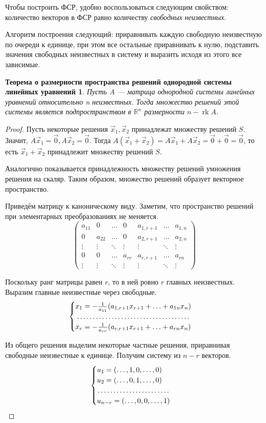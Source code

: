 \documentclass[a4paper, 12pt]{article}
\DeclareMathOperator{\rk}{rk}
\newtheorem*{solutions}{Теорема о размерности пространства решений однородной системы линейных уравнений}
\newcommand{\bbR}[0]{\mathbb{R}}
\begin{document}
Чтобы построить ФСР, удобно воспользоваться следующим свойством: количество векторов в ФСР равно количеству \textit{свободных неизвестных}.

Алгоритм построения следующий: приравнивать каждую свободную неизвестную по очереди к единице, при этом все остальные приравнивать к нулю, подставить значения свободных неизвестных в систему и выразить исходя из этого все зависимые.

\begin{solutions}
Пусть A --- матрица однородной системы линейных уравнений относительно n неизвестных. Тогда множество решений этой системы является подпространством в $\bbR^n$ размерности $n - \rk A$.
\end{solutions}
\begin{proof}
Пусть некоторые решения $\vec x_1, \vec x_2$ принадлежат множеству решений $S$. Значит, $A\vec x_1 = \vec{0}, A\vec x_2 = \vec 0$. Тогда $A(\vec x_1 + \vec x_2) = A\vec x_1 + A\vec x_2 = \vec 0 + \vec 0 = \vec 0$, то есть $\vec x_1 + \vec x_2$ принадлежит множеству решений $S$.

Аналогично показывается принадлежность множеству решений умножения решения на скаляр. Таким образом, множество решений образует векторное пространство.

Приведём матрицу к каноническому виду. Заметим, что пространство решений при элементарных преобразованиях не меняется.
\[\begin{pmatrix}a_{11} & 0 & \ldots & 0 & a_{1,r+1} & \ldots & a_{1,n} \\ 0 & a_{22} & \ldots & 0 & a_{2,r+1} & \ldots & a_{2,n} \\ \vdots & \vdots & \ddots & \vdots & \vdots & \ddots & \vdots \\ 0 & 0 & \ldots & a_{rr} & a_{r,r+1} & \ldots & a_{rn} \\ \vdots & \vdots & \ddots & \vdots & \vdots & \ddots & \vdots \end{pmatrix}\]

Поскольку ранг матрицы равен  $r$, то в ней ровно $r$ главных неизвестных. Выразим главные неизвестные через свободные.
\[\begin{cases} x_1 = -\frac{1}{a_{11}}(a_{1,r+1}x_{r+1} + \ldots + a_{1n}x_n) \\
\dotfill \\
 x_r = -\frac{1}{a_{rr}}(a_{r,r+1}x_{r+1} + \ldots + a_{rn}x_n)\end{cases}\]

Из общего решения выделим некоторые частные решения, приравнивая свободные неизвестные к единице. Получим систему из $n-r$ векторов.
\[\begin{cases}u_1 = (\ldots, 1, 0, \ldots , 0) \\
u_2 = (\ldots, 0, 1, \ldots , 0) \\
\dotfill \\
u_{n-r} = (\ldots, 0, 0, \ldots , 1) \end{cases}\]


\end{proof}
\end{document}
